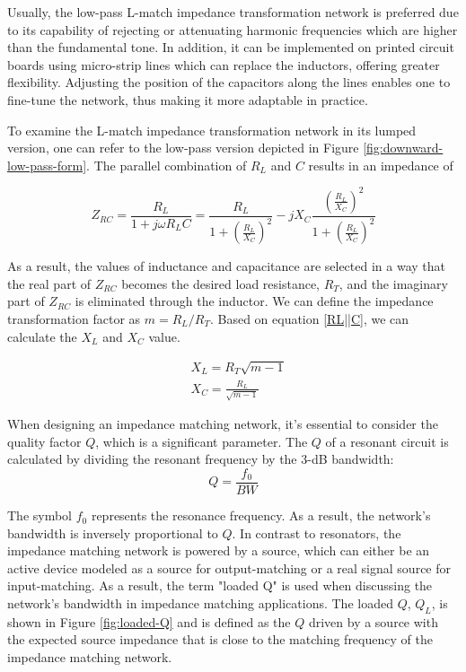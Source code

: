 Usually, the low-pass L-match impedance transformation network is preferred due to its capability of rejecting or attenuating harmonic frequencies which are higher than the fundamental tone. In addition, it can be implemented on printed circuit boards using micro-strip lines which can replace the inductors, offering greater flexibility. Adjusting the position of the capacitors along the lines enables one to fine-tune the network, thus making it more adaptable in practice.

To examine the L-match impedance transformation network in its lumped version, one can refer to the low-pass version depicted in Figure \ref{fig:downward-low-pass-form}. The parallel combination of $R_L$ and $C$ results in an impedance of
 
\begin{equation}
    Z_{RC}=\frac{R_L}{1+j\omega R_L C}=\frac{R_L}{1+\left(\frac{R_L}{X_C}\right)^2}-jX_C\frac{\left(\frac{R_L}{X_C}\right)^2}{1+\left(\frac{R_L}{X_C}\right)^2}\label{RL||C}
\end{equation}

As a result, the values of inductance and capacitance are selected in a way that the real part of $Z_{RC}$ becomes the desired load resistance, $R_T$, and the imaginary part of $Z_{RC}$ is eliminated through the inductor. We can define the impedance transformation factor as $m = R_L/R_T$. Based on equation \eqref{RL||C}, we can calculate the $X_L$ and $X_C$ value.

\begin{align}
    &X_L=R_T\sqrt{m-1}\\
    &X_C=\frac{R_L}{\sqrt{m-1}}
\end{align}

When designing an impedance matching network, it's essential to consider the quality factor $Q$, which is a significant parameter. The $Q$ of a resonant circuit is calculated by dividing the resonant frequency by the 3-dB bandwidth:
\begin{equation}
    Q=\frac{f_0}{BW}
\end{equation}

The symbol $f_0$ represents the resonance frequency. As a result, the network's bandwidth is inversely proportional to $Q$. In contrast to resonators, the impedance matching network is powered by a source, which can either be an active device modeled as a source for output-matching or a real signal source for input-matching. As a result, the term "loaded Q" is used when discussing the network's bandwidth in impedance matching applications. The loaded $Q$, $Q_L$, is shown in Figure \ref{fig:loaded-Q} and is defined as the $Q$ driven by a source with the expected source impedance that is close to the matching frequency of the impedance matching network.


